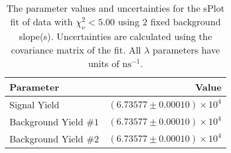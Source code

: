 
\begin{table}
    \begin{center}
        \begin{tabular}{lr}\toprule
            Parameter & Value \\\midrule
            Signal Yield & $(6.73577 \pm 0.00010) \times 10^{4}$ \\
            Background Yield $\#1$ & $(6.73577 \pm 0.00010) \times 10^{4}$ \\
            Background Yield $\#2$ & $(6.73577 \pm 0.00010) \times 10^{4}$ \\\bottomrule
        \end{tabular}
        \caption{The parameter values and uncertainties for the sPlot fit of data with $\chi^2_\nu < 5.00$ using 2 fixed background slope(s). Uncertainties are calculated using the covariance matrix of the fit. All $\lambda$ parameters have units of $\si{\nano\second}^{-1}$.}
    \end{center}
\end{table}
